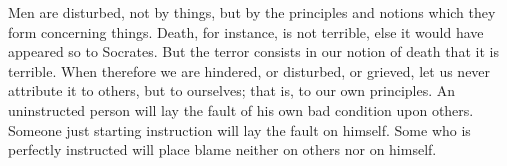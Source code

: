 Men are disturbed, not by things, but  by the principles and notions which they
form concerning  things. Death, for  instance, is  not terrible, else  it would
have appeared so  to Socrates. But the  terror consists in our  notion of death
that it is terrible. When therefore  we are hindered, or disturbed, or grieved,
let us  never attribute it  to others,  but to ourselves;  that is, to  our own
principles. An uninstructed person will lay  the fault of his own bad condition
upon others. Someone  just starting instruction will lay the  fault on himself.
Some who  is perfectly  instructed will  place blame neither  on others  nor on
himself.
